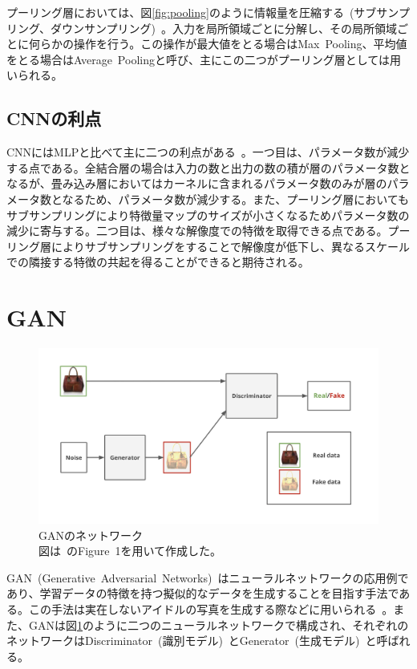 プーリング層においては、図\ref{fig:pooling}のように情報量を圧縮する~(サブサンプリング、ダウンサンプリング)~。入力を局所領域ごとに分解し、その局所領域ごとに何らかの操作を行う。この操作が最大値をとる場合はMax~Pooling、平均値をとる場合はAverage~Poolingと呼び、主にこの二つがプーリング層としては用いられる。

\subsection{CNNの利点}

CNNにはMLPと比べて主に二つの利点がある~\cite{CNNsurvey}。一つ目は、パラメータ数が減少する点である。全結合層の場合は入力の数と出力の数の積が層のパラメータ数となるが、畳み込み層においてはカーネルに含まれるパラメータ数のみが層のパラメータ数となるため、パラメータ数が減少する。また、プーリング層においてもサブサンプリングにより特徴量マップのサイズが小さくなるためパラメータ数の減少に寄与する。二つ目は、様々な解像度での特徴を取得できる点である。プーリング層によりサブサンプリングをすることで解像度が低下し、異なるスケールでの隣接する特徴の共起を得ることができると期待される。

\section{GAN}

\begin{figure}[b]
\begin{center}
\includegraphics[width=\hsize]{figure/GAN_net.png}
\caption{GANのネットワーク\\
図は~\cite{pix2pix}のFigure~1を用いて作成した。}
\label{fig:GAN_net}
\end{center}
\end{figure}

GAN~(Generative~Adversarial~Networks)~\cite{GAN}はニューラルネットワークの応用例であり、学習データの特徴を持つ擬似的なデータを生成することを目指す手法である。この手法は実在しないアイドルの写真を生成する際などに用いられる~\cite{idol}。また、GANは図\ref{fig:GAN_net}のように二つのニューラルネットワークで構成され、それぞれのネットワークはDiscriminator~(識別モデル)~とGenerator~(生成モデル)~と呼ばれる。

